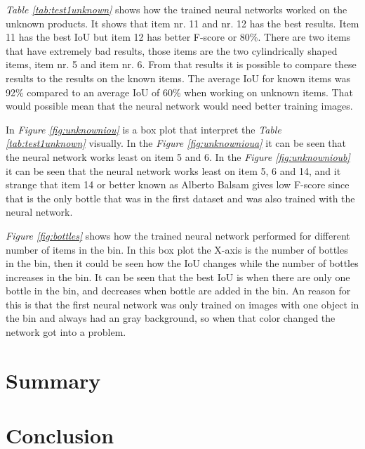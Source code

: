 \textit{Table \ref{tab:test1unknown}} shows how the trained neural networks worked on the unknown products. It shows that item nr. 11 and nr. 12 has the best results. Item 11 has the best IoU but item 12 has better F-score or 80\%. There are two items that have extremely bad results, those items are the two cylindrically shaped items, item nr. 5 and item nr. 6. From that results it is possible to compare these results to the results on the known items. The average IoU for known items was 92\% compared to an average IoU of 60\% when working on unknown items. That would possible mean that the neural network would need better training images. 

In \textit{Figure \ref{fig:unknowniou}} is a box plot that interpret the \textit{Table \ref{tab:test1unknown}} visually. In the \textit{Figure \ref{fig:unknownioua}} it can be seen that the neural network works least on item 5 and 6. In the \textit{Figure \ref{fig:unknownioub}} it can be seen that the neural network works least on item 5, 6 and 14, and it strange that item 14 or better known as Alberto Balsam gives low F-score since that is the only bottle that was in the first dataset and was also trained with the neural network.

\textit{Figure \ref{fig:bottles}} shows how the trained neural network performed for different number of items in the bin. In this box plot the X-axis is the number of bottles in the bin, then it could be seen how the IoU changes while the number of bottles increases in the bin. It can be seen that the best IoU is when there are only one bottle in the bin, and decreases when bottle are added in the bin. An reason for this is that the first neural network was only trained on images with one object in the bin and always had an gray background, so when that color changed the network got into a problem.




\section{Summary}

\section{Conclusion\label{sec:conclusions}}

